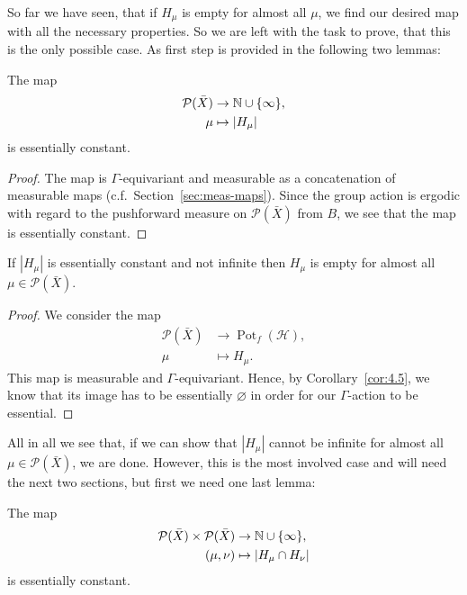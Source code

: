 So far we have seen, that if \(H_\mu\) is empty for almost all \(\mu\), we find our desired map with all the necessary properties. So we are left with the task to prove, that this is the only possible case. As first step is provided in the following two lemmas:

\begin{lemma}
  \label{lem:h-const}
  The map
  \begin{align*}
    \mathcal{P}(\bar X) &\to \mathbb{N} \cup \{\infty\},\\
    \mu &\mapsto |H_\mu|
  \end{align*}
  is essentially constant.
\end{lemma}

\begin{proof}
  The map is \(\Gamma\)-equivariant and measurable as a concatenation of measurable maps (c.f.~Section~\ref{sec:meas-maps}). Since the group action is ergodic with regard to the pushforward measure on \(\mathcal{P}(\bar X)\) from \(B\), we see that the map is essentially constant.
\end{proof}

\begin{lemma}
  \label{lem:finite-zero}
  If \(|H_\mu|\) is essentially constant and not infinite then \(H_\mu\) is empty for almost all \(\mu \in \mathcal{P}(\bar X)\).
\end{lemma}

\begin{proof}
  We consider the map
  \begin{align*}
    \mathcal{P}(\bar X) & \to \operatorname{Pot}_f(\mathcal{H}),\\
    \mu & \mapsto H_\mu.
  \end{align*}
  This map is measurable and \(\Gamma\)-equivariant. Hence, by Corollary~\ref{cor:4.5}, we know that its image has to be essentially \(\varnothing\) in order for our \(\Gamma\)-action to be essential.
\end{proof}

All in all we see that, if we can show that \(|H_\mu|\) cannot be infinite for almost all \(\mu \in \mathcal{P}(\bar X)\), we are done. However, this is the most involved case and will need the next two sections, but first we need one last lemma:

\begin{lemma}
  \label{lem:hh-const}
  The map
  \begin{align*}
    \mathcal{P}(\bar X) \times \mathcal{P}(\bar X) &\to \mathbb{N} \cup \{\infty\},\\
    (\mu, \nu) &\mapsto |H_\mu \cap H_\nu|
  \end{align*}
  is essentially constant.
\end{lemma}

